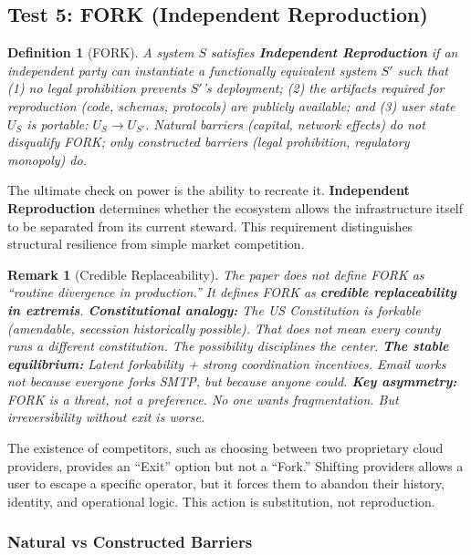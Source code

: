 \documentclass{article}
\newtheorem{definition}{Definition}
\newtheorem{remark}{Remark}
\begin{document}
\subsection{Test 5: FORK (Independent Reproduction)}

\begin{definition}[FORK]
\label{def:fork}
A system $S$ satisfies \textbf{Independent Reproduction} if an independent party can instantiate a functionally equivalent system $S'$ such that (1) no legal prohibition prevents $S'$'s deployment; (2) the artifacts required for reproduction (code, schemas, protocols) are publicly available; and (3) user state $U_S$ is portable: $U_S \to U_{S'}$. Natural barriers (capital, network effects) do not disqualify FORK; only constructed barriers (legal prohibition, regulatory monopoly) do.
\end{definition}

The ultimate check on power is the ability to recreate it. \textbf{Independent Reproduction} determines whether the ecosystem allows the infrastructure itself to be separated from its current steward. This requirement distinguishes structural resilience from simple market competition.

\begin{remark}[Credible Replaceability]
The paper does not define FORK as ``routine divergence in production.'' It defines FORK as \textbf{credible replaceability in extremis}. \textbf{Constitutional analogy:} The US Constitution is forkable (amendable, secession historically possible). That does not mean every county runs a different constitution. The \textit{possibility} disciplines the center. \textbf{The stable equilibrium:} Latent forkability + strong coordination incentives. Email works not because everyone forks SMTP, but because anyone \textit{could}. \textbf{Key asymmetry:} FORK is a threat, not a preference. No one wants fragmentation. But irreversibility without exit is worse.
\end{remark}

The existence of competitors, such as choosing between two proprietary cloud providers, provides an ``Exit'' option but not a ``Fork.'' Shifting providers allows a user to escape a specific operator, but it forces them to abandon their history, identity, and operational logic. This action is substitution, not reproduction.

\subsubsection{Natural vs Constructed Barriers}
\end{document}
